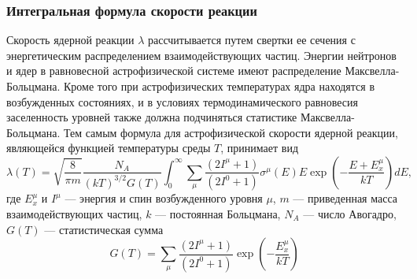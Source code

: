 \subsubsection{Интегральная формула скорости реакции}
Скорость ядерной реакции $\lambda$ рассчитывается путем свертки ее сечения с энергетическим распределением взаимодействующих частиц. Энергии нейтронов и ядер в равновесной астрофизической системе имеют распределение Максвелла-Больцмана. Кроме того при астрофизических температурах ядра находятся в возбужденных состояниях, и в условиях термодинамического равновесия заселенность уровней также должна подчиняться статистике Максвелла-Больцмана. Тем самым формула для астрофизической скорости ядерной реакции, являющейся функцией температуры среды $T$, принимает вид
\begin{equation}
\displaystyle
\lambda(T) = \sqrt{\frac{8}{\pi m}} \frac{N_A}{(k T)^{3/2} G(T)} \int_0^\infty \sum_\mu \frac{(2 I^\mu + 1)}{(2 I^0 + 1)} \sigma^\mu(E) E \exp \left( - \frac{E + E_x^\mu}{kT} \right) dE,
\label{eq:rate}
\end{equation}
где $E^\mu_x$ и $I^\mu$ --- энергия и спин возбужденного уровня $\mu$, $m$ --- приведенная масса взаимодействующих частиц, $k$ --- постоянная Больцмана, $N_A$ --- число Авогадро, $G(T)$ --- статистическая сумма
\begin{equation}
    \displaystyle
    G(T) = \sum_\mu \frac{(2 I^\mu + 1)}{(2 I^0 + 1)} \exp \left( - \frac{E_x^\mu}{kT} \right)
\end{equation}
